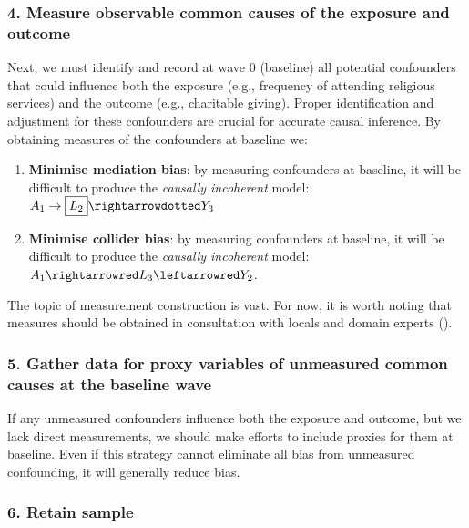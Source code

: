 \documentclass[
  singlecolumn]{article}
\begin{document}
\subsubsection{4. Measure observable common causes of the exposure and
outcome}\label{measure-observable-common-causes-of-the-exposure-and-outcome}

Next, we must identify and record at wave 0 (baseline) all potential
confounders that could influence both the exposure (e.g., frequency of
attending religious services) and the outcome (e.g., charitable giving).
Proper identification and adjustment for these confounders are crucial
for accurate causal inference. By obtaining measures of the confounders
at baseline we:

\begin{enumerate}
\def\labelenumi{\alph{enumi}.}
\item
  \textbf{Minimise mediation bias}: by measuring confounders at
  baseline, it will be difficult to produce the \emph{causally
  incoherent} model: \(A_1\to \boxed{L_2} \rightarrowdotted Y_3\)
\item
  \textbf{Minimise collider bias}: by measuring confounders at baseline,
  it will be difficult to produce the \emph{causally incoherent} model:
  \(A_1\rightarrowred L_3 \leftarrowred Y_2\).
\end{enumerate}

The topic of measurement construction is vast. For now, it is worth
noting that measures should be obtained in consultation with locals and
domain experts ().

\subsubsection{5. Gather data for proxy variables of unmeasured common
causes at the baseline
wave}\label{gather-data-for-proxy-variables-of-unmeasured-common-causes-at-the-baseline-wave}

If any unmeasured confounders influence both the exposure and outcome,
but we lack direct measurements, we should make efforts to include
proxies for them at baseline. Even if this strategy cannot eliminate all
bias from unmeasured confounding, it will generally reduce bias.

\subsubsection{6. Retain sample}\label{retain-sample}
\end{document}
